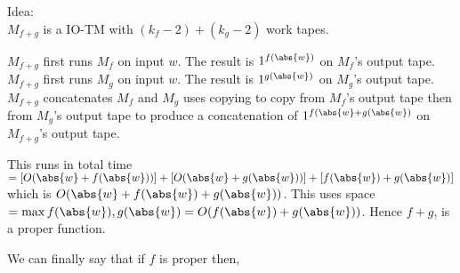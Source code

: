 Idea: \\
$M_{f+g}$ is a IO-TM with $(k_f - 2) + (k_g - 2)$ work tapes.

$M_{f+g}$ first runs $M_f$ on input $w$. 
The result is $1^{f(\abs{w})}$ on $M_f$'s output tape.
$M_{f+g}$ first runs $M_g$ on input $w$. 
The result is $1^{g(\abs{w})}$ on $M_g$'s output tape.
$M_{f+g}$ concatenates $M_f$ and $M_g$ uses copying
to copy from $M_f$'s output tape then from $M_g$'s output tape
to produce a concatenation of $1^{f(\abs{w} + g(\abs{w})}$ 
on $M_{f+g}$'s output tape.

This runs in total time $= [O(\abs{w}+f(\abs{w}))] + [O(\abs{w}+g(\abs{w}))]  
+ [f(\abs{w}) + g(\abs{w})]$ which is $O(\abs{w}+f(\abs{w})+g(\abs{w}))$. 
This uses space $= \max{f(\abs{w}),g(\abs{w})} = O(f(\abs{w}) + g(\abs{w}))$. 
Hence $f + g$, is a proper function.

\frmrule




\frmrule




We can finally say that if $f$ is proper then,
